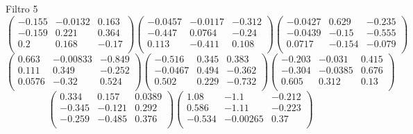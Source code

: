 Filtro 5
{ \small
\[
\begin{pmatrix}
  -0.155 & -0.0132 & 0.163 \\
  -0.159 & 0.221 & 0.364 \\
  0.2 & 0.168 & -0.17 \\
\end{pmatrix}
\begin{pmatrix}
  -0.0457 & -0.0117 & -0.312 \\
  -0.447 & 0.0764 & -0.24 \\
  0.113 & -0.411 & 0.108 \\
\end{pmatrix}
\begin{pmatrix}
  -0.0427 & 0.629 & -0.235 \\
  -0.0439 & -0.15 & -0.555 \\
  0.0717 & -0.154 & -0.079 \\
\end{pmatrix}
\]
\[
\begin{pmatrix}
  0.663 & -0.00833 & -0.849 \\
  0.111 & 0.349 & -0.252 \\
  0.0576 & -0.32 & 0.524 \\
\end{pmatrix}
\begin{pmatrix}
  -0.516 & 0.345 & 0.383 \\
  -0.0467 & 0.494 & -0.362 \\
  0.502 & 0.229 & -0.732 \\
\end{pmatrix}
\begin{pmatrix}
  -0.203 & -0.031 & 0.415 \\
  -0.304 & -0.0385 & 0.676 \\
  0.605 & 0.312 & 0.13 \\
\end{pmatrix}
\]
\[
\begin{pmatrix}
  0.334 & 0.157 & 0.0389 \\
  -0.345 & -0.121 & 0.292 \\
  -0.259 & -0.485 & 0.376 \\
\end{pmatrix}
\begin{pmatrix}
  1.08 & -1.1 & -0.212 \\
  0.586 & -1.11 & -0.223 \\
  -0.534 & -0.00265 & 0.37 \\
\end{pmatrix}
\]
}

